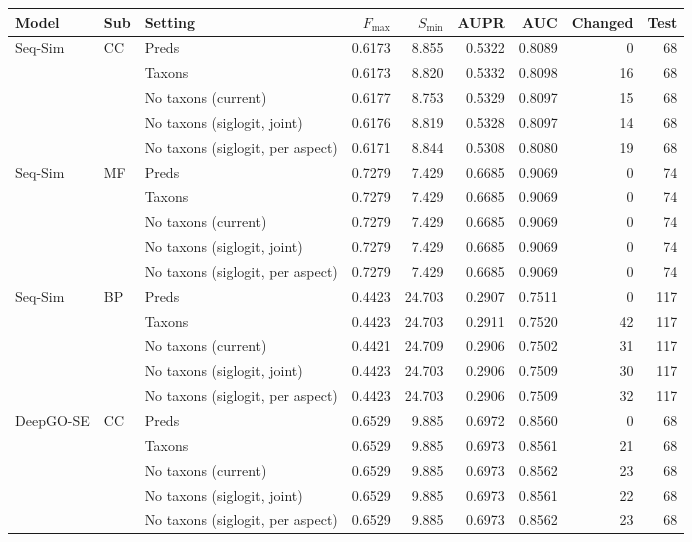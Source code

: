 \begin{tabular}{lllrrrrrr}
\toprule
Model & Sub & Setting & $F_{\max}$ & $S_{\min}$ & AUPR & AUC & Changed & Test \\
\midrule
Seq-Sim & CC & Preds & 0.6173 & 8.855 & 0.5322 & 0.8089 & 0 & 68 \\
 &  & Taxons & 0.6173 & 8.820 & 0.5332 & 0.8098 & 16 & 68 \\
 &  & No taxons (current) & 0.6177 & 8.753 & 0.5329 & 0.8097 & 15 & 68 \\
 &  & No taxons (siglogit, joint) & 0.6176 & 8.819 & 0.5328 & 0.8097 & 14 & 68 \\
 &  & No taxons (siglogit, per aspect) & 0.6171 & 8.844 & 0.5308 & 0.8080 & 19 & 68 \\
\addlinespace
Seq-Sim & MF & Preds & 0.7279 & 7.429 & 0.6685 & 0.9069 & 0 & 74 \\
 &  & Taxons & 0.7279 & 7.429 & 0.6685 & 0.9069 & 0 & 74 \\
 &  & No taxons (current) & 0.7279 & 7.429 & 0.6685 & 0.9069 & 0 & 74 \\
 &  & No taxons (siglogit, joint) & 0.7279 & 7.429 & 0.6685 & 0.9069 & 0 & 74 \\
 &  & No taxons (siglogit, per aspect) & 0.7279 & 7.429 & 0.6685 & 0.9069 & 0 & 74 \\
\addlinespace
Seq-Sim & BP & Preds & 0.4423 & 24.703 & 0.2907 & 0.7511 & 0 & 117 \\
 &  & Taxons & 0.4423 & 24.703 & 0.2911 & 0.7520 & 42 & 117 \\
 &  & No taxons (current) & 0.4421 & 24.709 & 0.2906 & 0.7502 & 31 & 117 \\
 &  & No taxons (siglogit, joint) & 0.4423 & 24.703 & 0.2906 & 0.7509 & 30 & 117 \\
 &  & No taxons (siglogit, per aspect) & 0.4423 & 24.703 & 0.2906 & 0.7509 & 32 & 117 \\
\midrule
DeepGO-SE & CC & Preds & 0.6529 & 9.885 & 0.6972 & 0.8560 & 0 & 68 \\
 &  & Taxons & 0.6529 & 9.885 & 0.6973 & 0.8561 & 21 & 68 \\
 &  & No taxons (current) & 0.6529 & 9.885 & 0.6973 & 0.8562 & 23 & 68 \\
 &  & No taxons (siglogit, joint) & 0.6529 & 9.885 & 0.6973 & 0.8561 & 22 & 68 \\
 &  & No taxons (siglogit, per aspect) & 0.6529 & 9.885 & 0.6973 & 0.8562 & 23 & 68 \\

\end{tabular}
